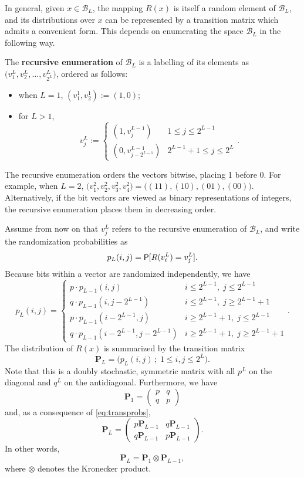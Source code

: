 \documentclass[11pt,draft]{article}
\newcommand{\Bsp}{\mathcal{B}}
\newcommand{\Pm}{\mathbf{P}}
\begin{document}

In general, given $x\in\Bsp_L$, the mapping $R(x)$ is itself a random element of
$\Bsp_L$, and its distributions over $x$ can be represented by a transition
matrix which admits a convenient form.
This depends on enumerating the space $\Bsp_L$ in the following way.

\begin{defn}
The \textbf{recursive enumeration} of $\Bsp_L$ is a labelling of its elements
as $\big(v_1^L,v_2^L,\dots,v_{2^L}^L\big)$, ordered as follows:
\begin{itemize}
\item when $L=1$, $(v_1^1, v_2^1) := (1, 0)$;
\item for $L > 1$,
\[ v_j^L := \begin{cases}(1, v_j^{L-1}) & 1 \leq j \leq 2^{L-1} \\
    (0, v_{j - 2^{L-1}}^{L-1}) & 2^{L-1} + 1 \leq j \leq 2^L \end{cases}. \]
\end{itemize}
\end{defn}

The recursive enumeration orders the vectors bitwise, placing 1 before 0.
For example, when $L=2$,
$\big(v_1^2, v_2^2, v_3^2, v_4^2\big) = \big((11), (10), (01), (00)\big)$.
Alternatively, if the bit vectors are viewed as binary representations of
integers, the recursive enumeration places them in decreasing order.

Assume from now on that $v_j^L$ refers to the recursive enumeration of
$\Bsp_L$, and write the randomization probabilities as
\[ p_L(i,j) = \P[R(v_i^L) = v_j^L]. \]
Because bits within a vector are randomized independently, we have
\begin{equation} \label{eq:transprobs}
p_L(i,j) = \begin{cases}
p\cdot p_{L-1}(i, j) &
    i \leq 2^{L-1},\; j \leq 2^{L-1} \\
q\cdot p_{L-1}(i,j - 2^{L-1}) &
    i \leq 2^{L-1},\; j \geq 2^{L-1} + 1 \\
p\cdot p_{L-1}(i - 2^{L-1},j) &
    i \geq 2^{L-1} + 1,\; j \leq 2^{L-1} \\
q\cdot p_{L-1}(i - 2^{L-1},j - 2^{L-1}) &
    i \geq 2^{L-1} + 1,\; j \geq 2^{L-1} + 1
 \end{cases}.
\end{equation}
The distribution of $R(x)$ is summarized by the transition matrix
\[ \Pm_L = \Big(p_L(i,j)\,;\; 1 \leq i,j \leq 2^L\Big). \]
Note that this is a doubly stochastic, symmetric matrix with all $p^L$ on
the diagonal and $q^L$ on the antidiagonal.
Furthermore, we have
\[ \Pm_1 = \begin{pmatrix}p & q \\ q & p \end{pmatrix} \]
and, as a consequence of \eqref{eq:transprobs},
\[ \Pm_L = \begin{pmatrix} p\Pm_{L-1} & q\Pm_{L-1} \\
q\Pm_{L-1} & p\Pm_{L-1} \end{pmatrix}. \]
In other words,
\[ \Pm_L = \Pm_1 \otimes \Pm_{L-1}, \]
where $\otimes$ denotes the Kronecker product.
\end{document}
